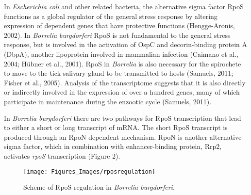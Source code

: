 \documentclass[12pt,twoside]{reedthesis}
\begin{document}
	 In \textit{Escherichia coli} and other related bacteria, the alternative sigma factor RpoS functions as a global regulator of the general stress response by altering expression of dependent genes that have protective functions (Hengge-Aronis, 2002). In \textit{Borrelia burgdorferi} RpoS is not fundamental to the general stress response, but is involved in the activation of OspC and decorin-binding protein A (DbpA), another lipoprotein involved in mammalian infection (Caimano et al., 2004; H\"ubner et al., 2001). RpoS in \textit{Borrelia} is also necessary for the spirochete to move to the tick salivary gland to be transmitted to hosts (Samuels, 2011; Fisher et al., 2005). Analysis of the transcriptome suggests
	 that it is also directly or indirectly involved in the expression of over a hundred genes, many of which participate in maintenance during the enzootic cycle  (Samuels, 2011). 
	 
		In \textit{Borrelia burgdorferi} there are two pathways for RpoS transcription that lead to either a short or long transcript of mRNA. The short RpoS transcript is produced through an RpoN dependent mechanism. RpoN is another alternative sigma factor, which in combination with enhancer-binding protein, Rrp2, activates \textit{rpoS} transcription (Figure 2). 
		
		
				\begin{figure}[h]
					
					\centering
					\texttt{[image: Figures\_Images/rposregulation]}
					\caption[RpoS Regulation]{Scheme of RpoS regulation in \textit{Borrelia burgdorferi}.}
					\label{RpoSReg}
				\end{figure}
				
\end{document}
